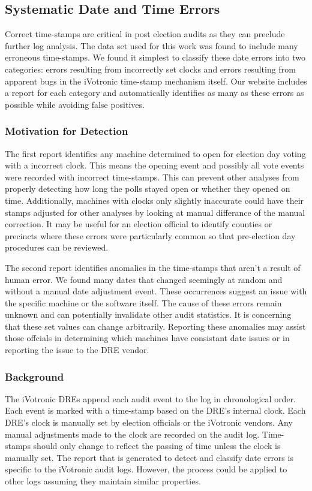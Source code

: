 \subsection{Systematic Date and Time Errors}\label{an:date} 
Correct time-stamps are critical in post election audits as they can preclude further log analysis. The data set used for this work was found to include many erroneous time-stamps. We found it simplest to classify these date errors into two categories: errors resulting from incorrectly set clocks and errors resulting from apparent bugs in the iVotronic time-stamp mechanism itself. Our website includes a report for each category and automatically identifies as many as these errors as possible while avoiding false positives.  

\subsubsection{Motivation for Detection}
The first report identifies any machine determined to open for election day voting with a incorrect clock.  This means the opening event and possibly all vote events were recorded with incorrect time-stamps. This can prevent other analyses from properly detecting how long the polls stayed open or whether they opened on time. Additionally, machines with clocks only slightly inaccurate could have their stamps adjusted for other analyses by looking at manual differance of the manual correction. It may be useful for an election official to identify counties or precincts where these errors were particularly common so that pre-election day procedures can be reviewed.

The second report identifies anomalies in the time-stamps that aren't a result of human error. We found many dates that changed seemingly at random and without a manual date adjustment event. These occurrences suggest an issue with the specific machine or the software itself. The cause of these errors remain unknown and can potentially invalidate other audit statistics. It is concerning that these set values can change arbitrarily. Reporting these anomalies may assist those offcials in determining which machines have consistant date issues or in reporting the issue to the DRE vendor.

\subsubsection{Background}
The iVotronic DREs append each audit event to the log in chronological order.  Each event is marked with a time-stamp based on the DRE's internal clock. Each DRE's clock is manually set by election officials or the iVotronic vendors. Any manual adjustments made to the clock are recorded on the audit log. Time-stamps should only change to reflect the passing of time unless the clock is manually set. The report that is generated to detect and classify date errors is specific to the iVotronic audit logs.  However, the process could be applied to other logs assuming they maintain similar properties.  

